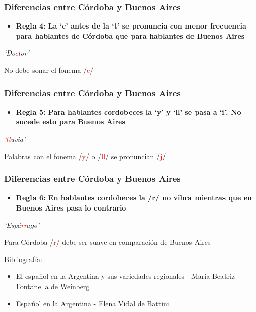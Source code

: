 \documentclass[mathserif]{beamer}%
\begin{document}
\begin{frame}
 	\frametitle{Diferencias entre Córdoba y Buenos Aires}
 	\begin{itemize}\itemsep=3ex
 		\item \textbf{Regla 4: La `c' antes de la `t' se pronuncia con menor frecuencia para hablantes de Córdoba que para hablantes de Buenos Aires} \\ 
 	\end{itemize}
 	
 	\begin{center}
 		\textit{`Do\textcolor{red}{c}tor'}
 	\end{center} 
 	
 	\begin{center}
 		No debe sonar el fonema /\textcolor{red}{c}/
 	\end{center}
\end{frame}

\begin{frame}
	\frametitle{Diferencias entre Córdoba y Buenos Aires}
	\begin{itemize}\itemsep=3ex
		\item \textbf{Regla 5: Para hablantes cordobeces la `y’ y `ll’ se pasa a `i’. No sucede esto para Buenos Aires} \\ 
	\end{itemize}
	
	\begin{center}
		\textit{`\textcolor{red}{ll}uvia'}
	\end{center} 
	
	\begin{center}
		Palabras con el fonema /\textcolor{red}{y}/ o /\textcolor{red}{ll}/ se pronuncian /\textcolor{red}{j}/
	\end{center}
\end{frame}
 
\begin{frame}
	\frametitle{Diferencias entre Córdoba y Buenos Aires}
	\begin{itemize}\itemsep=3ex
		\item \textbf{Regla 6: En hablantes cordobeces la /r/ no vibra mientras que en Buenos Aires pasa lo contrario} \\ 
	\end{itemize}	
	
	\begin{center}
		\textit{`Espá\textcolor{red}{rr}ago'}
	\end{center} 
	
	\begin{center}
		Para Córdoba /\textcolor{red}{r}/ debe ser suave en comparación de Buenos Aires
	\end{center}
	
	{\tiny Bibliografía:
		\begin{itemize}
			\item El español en la Argentina y sus variedades regionales - María Beatriz Fontanella de Weinberg
			\item Español en la Argentina - Elena Vidal de Battini
		\end{itemize}}		
\end{frame} 
\end{document}
